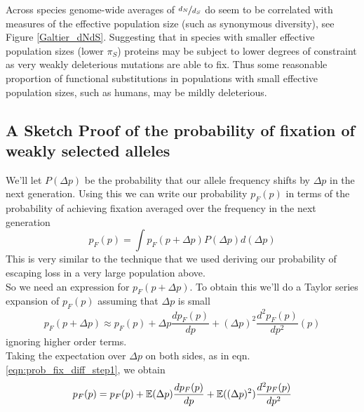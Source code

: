 Across species genome-wide averages of $\nicefrac{d_N}{d_S}$ do seem to be
correlated with measures of the effective population size (such as
synonymous diversity), see Figure \ref{Galtier_dNdS}. Suggesting that in species with smaller effective
population sizes (lower $\pi_S$) proteins may be subject to lower degrees of
constraint as very weakly deleterious mutations are able to fix. Thus
some reasonable proportion of functional substitutions in populations
with small effective population sizes, such as humans, may be mildly deleterious.

\subsection{A Sketch Proof of the probability of fixation of
weakly selected alleles} \label{Section:fixation_weakly_sel}

We'll let $P(\Delta p)$ be the probability that our allele frequency
shifts by $\Delta p$ in the next generation. Using this we can write our probability $p_F(p)$ in terms of the probability of
achieving fixation averaged over the frequency in the next generation
\begin{equation}
p_F(p)  = \int p_F(p+\Delta p) P(\Delta p) d(\Delta p) \label{eqn:prob_fix_diff_step1}
\end{equation}
This is very similar to the technique that we used deriving our
probability of escaping loss in a very large population above. \\

So we need an expression for $p_F(p+\Delta p)$. To obtain this we'll
do a Taylor series expansion of $p_F(p)$ assuming that $\Delta p $ is small
\begin{equation}
p_F(p+\Delta p) \approx p_F(p) + \Delta p \frac{dp_F(p)}{dp} + (\Delta p)^2
\frac{d^2p_F(p)}{dp^2} (p)
\end{equation}
ignoring higher order terms.\\

Taking the expectation over $\Delta p $ on both sides, as in
eqn. \ref{eqn:prob_fix_diff_step1}, we obtain
\begin{equation}
p_F(p) = p_F(p) + \mathbb{E}(\Delta p) \frac{dp_F (p)}{dp} + \mathbb{E}((\Delta p)^2)
\frac{d^2p_F(p)}{dp^2}
\end{equation}

